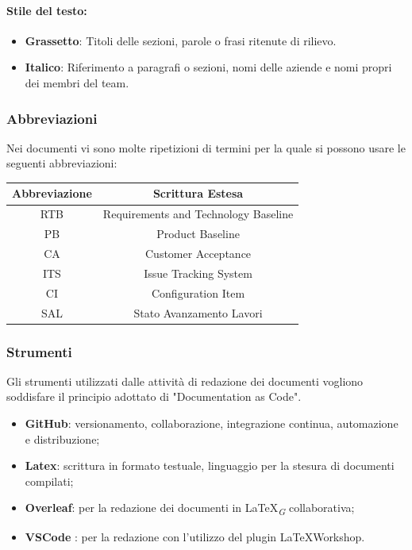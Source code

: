 \documentclass{article}
\begin{document}
\paragraph*{Stile del testo:}
\begin{itemize}
    \item \textbf{Grassetto}: Titoli delle sezioni, parole o frasi ritenute di rilievo.
    \item \textbf{Italico}: Riferimento a paragrafi o sezioni, nomi delle aziende e nomi propri dei membri del team.
\end{itemize}
\subsubsection{Abbreviazioni}
Nei documenti vi sono molte ripetizioni di termini per la quale si possono usare le seguenti abbreviazioni:\\
\vspace{0.2cm}
\begin{tabular}{|c|c|}
    \hline
    \textbf{Abbreviazione} & \textbf{Scrittura Estesa}            \\
    \hline
    RTB                    & Requirements and Technology Baseline \\
    PB                     & Product Baseline                     \\
    CA                     & Customer Acceptance                  \\
    ITS                    & Issue Tracking System                \\
    CI                     & Configuration Item                   \\
    SAL                    & Stato Avanzamento Lavori             \\   
    \hline
\end{tabular}

\subsubsection{Strumenti}
Gli strumenti utilizzati dalle attività di redazione dei documenti vogliono soddisfare il principio adottato di "Documentation as Code".
\begin{itemize}
    \item \textbf{GitHub}: versionamento, collaborazione, integrazione continua, automazione e distribuzione;
    \item \textbf{Latex}: scrittura in formato testuale, linguaggio per la stesura di documenti compilati;
    \item \textbf{Overleaf}: per la redazione dei documenti in \LaTeX\textsubscript{\textit{G}} collaborativa;
    \item \textbf{VSCode} : per la redazione con l'utilizzo del plugin \LaTeX Workshop.
\end{itemize}
\end{document}
